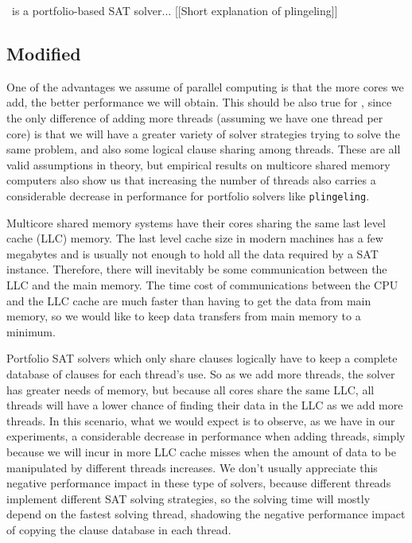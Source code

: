 \pling\ is a portfolio-based SAT solver... [[Short explanation of plingeling]]

\subsection{Modified \pling}
\label{sec:modifiedpling}


One of the advantages we assume of parallel computing is that the more
cores we add, the better performance we will obtain. This should be
also true for \pling, since the only difference of adding more threads
(assuming we have one thread per core) is that we will have a greater
variety of solver strategies trying to solve the same problem, and
also some logical clause sharing among threads. These are all valid
assumptions in theory, but empirical results on multicore shared
memory computers also show us that increasing the number of threads
also carries a considerable decrease in performance for portfolio
solvers like {\tt plingeling}.


Multicore shared memory systems have their cores sharing the same last
level cache (LLC) memory. The last level cache size in modern machines
has a few megabytes and is usually not enough to hold all the data
required by a SAT instance. Therefore, there will inevitably be some
communication between the LLC and the main memory. The time cost of
communications between the CPU and the LLC cache are much faster than
having to get the data from main memory, so we would like to keep data
transfers from main memory to a minimum.

Portfolio SAT solvers which only share clauses logically have to keep
a complete database of clauses for each thread's use. So as we add
more threads, the solver has greater needs of memory, but because all
cores share the same LLC, all threads will have a lower chance of
finding their data in the LLC as we add more threads. In this
scenario, what we would expect is to observe, as we have in our
experiments, a considerable decrease in performance when adding
threads, simply because we will incur in more LLC cache misses when
the amount of data to be manipulated by different threads
increases. We don't usually appreciate this negative performance
impact in these type of solvers, because different threads implement
different SAT solving strategies, so the solving time will mostly
depend on the fastest solving thread, shadowing the negative
performance impact of copying the clause database in each thread. 

